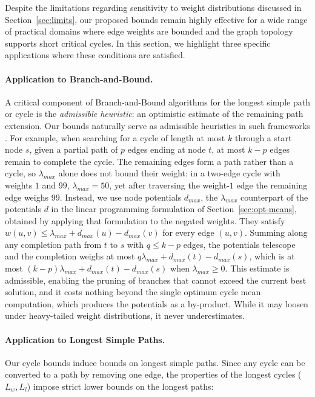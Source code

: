 \documentclass{article}
\theoremstyle{definition}
\begin{document}
Despite the limitations regarding sensitivity to weight distributions
discussed in Section~\ref{sec:limits}, our proposed bounds remain
highly effective for a wide range of practical domains where edge
weights are bounded and the graph topology supports short critical
cycles. In this section, we highlight three specific applications
where these conditions are satisfied.

\paragraph{Application to Branch-and-Bound.}
A critical component of Branch-and-Bound algorithms for the longest
simple path or cycle is the \textit{admissible heuristic}: an
optimistic estimate of the remaining path extension. Our bounds
naturally serve as admissible heuristics in such frameworks
\citep{MoJaSaSe16,StPuFe14,CoStFe20}.  For example, when searching for
a cycle of length at most $k$ through a start node $s$, given a
partial path of $p$ edges ending at node $t$, at most $k - p$ edges
remain to complete the cycle. The remaining edges form a path rather
than a cycle, so $\lambda_{max}$ alone does not bound their weight: in
a two-edge cycle with weights $1$ and $99$, $\lambda_{max} = 50$, yet
after traversing the weight-$1$ edge the remaining edge weighs
$99$. Instead, we use node potentials $d_{max}$, the $\lambda_{max}$
counterpart of the potentials $d$ in the linear programming
formulation of Section~\ref{sec:opt-means}, obtained by applying that
formulation to the negated weights. They satisfy $w(u,v) \leq
\lambda_{max} + d_{max}(u) - d_{max}(v)$ for every edge
$(u,v)$. Summing along any completion path from $t$ to $s$ with $q
\leq k - p$ edges, the potentials telescope and the completion weighs
at most $q\lambda_{max} + d_{max}(t) - d_{max}(s)$, which is at most
$(k - p)\lambda_{max} + d_{max}(t) - d_{max}(s)$ when $\lambda_{max}
\geq 0$. This
estimate is admissible, enabling the pruning of branches that cannot
exceed the current best solution, and it costs nothing beyond the
single optimum cycle mean computation, which produces the potentials
as a by-product. While it may loosen under heavy-tailed weight
distributions, it never underestimates.

\paragraph{Application to Longest Simple Paths.}
Our cycle bounds induce bounds on longest simple paths. Since any
cycle can be converted to a path by removing one edge, the properties
of the longest cycles ($L_w, L_l$) impose strict lower bounds on the
longest paths:
\end{document}
